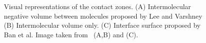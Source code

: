 \begin{figure}[h]
  \begin{center}
  \caption{Visual representations of the contact zones. (A) Intermolecular negative volume between molecules proposed by Lee and Varshney (B) Intermolecular volume only. (C) Interface surface proposed by Ban et al. Image taken from~\cite{lee2006computing} (A,B) and \cite{ban2006interface} (C).}
  \label{Fig:pdbsum}  
  \end{center}
\end{figure}

